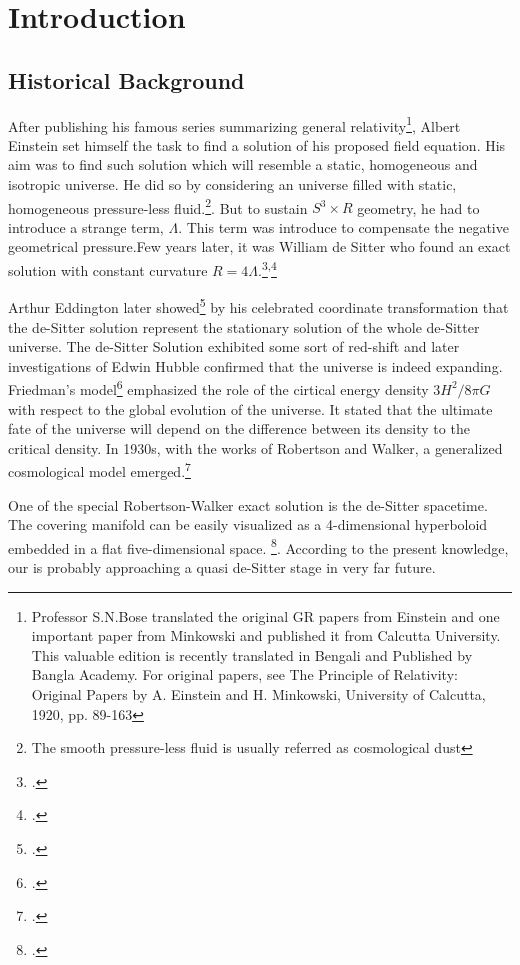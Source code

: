 \chapter{Introduction}



\section{Historical Background}

After publishing his famous series summarizing general
relativity\footnote{Professor S.N.Bose translated the original GR papers
from Einstein and one important paper from Minkowski and published it from
Calcutta University. This valuable edition is recently translated in
Bengali and Published by Bangla Academy. For original papers, see The
Principle of Relativity: Original Papers by A. Einstein and H. Minkowski,
University of Calcutta, 1920, pp. 89-163}, Albert Einstein set himself the
task to find a solution of his proposed field equation. His aim was to
find such solution which will resemble a static, homogeneous and isotropic
universe. He did so by considering an universe filled with static,
homogeneous pressure-less fluid.\footnote{The smooth pressure-less fluid
is usually referred as cosmological dust}. But to sustain $S^3 \times R$
geometry, he had to introduce a strange term, $\Lambda$. This term was
introduce to compensate the negative geometrical pressure.Few years later,
it was William de Sitter who found an exact solution with constant
curvature
$R=4\Lambda$.\footcite{de:1917a}\textsuperscript{,}\footcite{de:1917b}

Arthur Eddington later showed\footcite{eddington:1924} by his celebrated
coordinate transformation that the de-Sitter solution represent the
stationary solution of the whole de-Sitter universe. The de-Sitter
Solution exhibited some sort of red-shift and later investigations of
Edwin Hubble confirmed that the universe is  indeed  expanding. Friedman's
model\footcite{friedman:1999} emphasized the role of the cirtical energy
density $3H^2/8\pi G$ with respect to the global evolution of the
universe. It stated that the ultimate fate of the universe will depend on
the difference between its density to the critical density. In 1930s, with
the works of Robertson and Walker, a generalized cosmological model
emerged.\footcite[For a review see][]{carroll:2004}

One of the special Robertson-Walker exact solution is the de-Sitter
spacetime. The covering manifold can be easily visualized as
a 4-dimensional hyperboloid embedded in a flat five-dimensional space.
\footcite{hawking:1973}. According to the present knowledge, our is
probably approaching a quasi de-Sitter stage in very far future.

